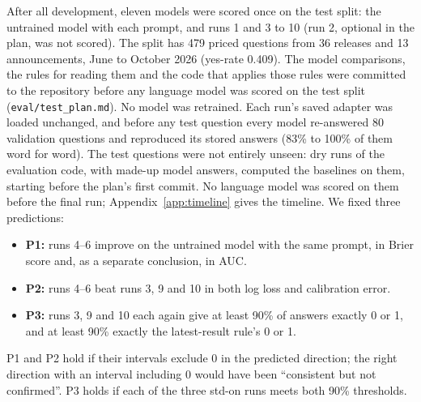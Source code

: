 \documentclass[11pt]{article}
\begin{document}
After all development, eleven models were scored once on the test split: the untrained model with each prompt, and runs 1 and 3 to 10 (run 2, optional in the plan, was not scored). The split has 479 priced questions from 36 releases and 13 announcements, June to October 2026 (yes-rate 0.409). The model comparisons, the rules for reading them and the code that applies those rules were committed to the repository before any language model was scored on the test split (\texttt{eval/test\_plan.md}). No model was retrained. Each run's saved adapter was loaded unchanged, and before any test question every model re-answered 80 validation questions and reproduced its stored answers (83\% to 100\% of them word for word). The test questions were not entirely unseen: dry runs of the evaluation code, with made-up model answers, computed the baselines on them, starting before the plan's first commit. No language model was scored on them before the final run; Appendix~\ref{app:timeline} gives the timeline. We fixed three predictions:
\begin{itemize}[leftmargin=*]
\item \textbf{P1:} runs 4--6 improve on the untrained model with the same prompt, in Brier score and, as a separate conclusion, in AUC.
\item \textbf{P2:} runs 4--6 beat runs 3, 9 and 10 in both log loss and calibration error.
\item \textbf{P3:} runs 3, 9 and 10 each again give at least 90\% of answers exactly 0 or 1, and at least 90\% exactly the latest-result rule's 0 or 1.
\end{itemize}
P1 and P2 hold if their intervals exclude 0 in the predicted direction; the right direction with an interval including 0 would have been ``consistent but not confirmed''. P3 holds if each of the three std-on runs meets both 90\% thresholds.
\end{document}
